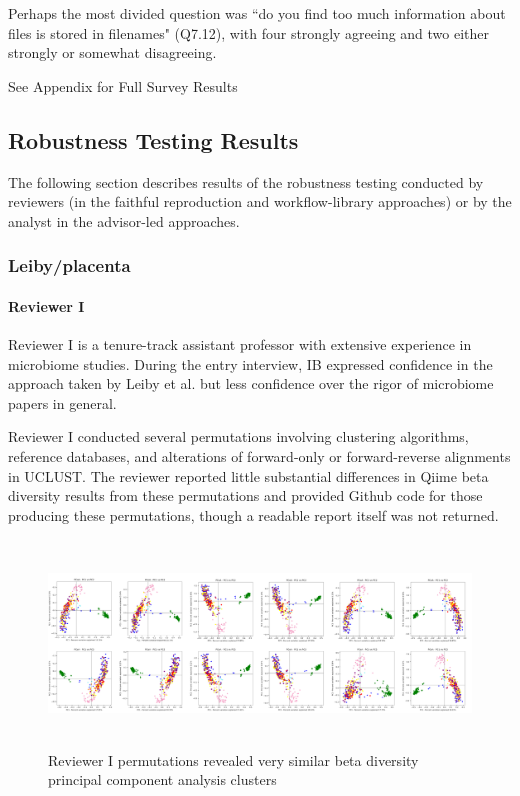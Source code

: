 \documentclass{drexelthesis}
\begin{document}
Perhaps the most divided question was ``do you find too much information about files is stored in filenames" (Q7.12), with four strongly agreeing and two either strongly or somewhat disagreeing.

See Appendix for Full Survey Results

\subsection{Robustness Testing Results}

The following section describes results of the robustness testing conducted by reviewers (in the faithful reproduction and workflow-library approaches) or by the analyst in the advisor-led approaches.

\subsubsection{Leiby/placenta}

\paragraph{Reviewer I}
Reviewer I is a tenure-track assistant professor with extensive experience in microbiome studies. During the entry interview, IB expressed confidence in the approach taken by Leiby et al. but less confidence over the rigor of microbiome papers in general.

Reviewer I conducted several permutations involving clustering algorithms, reference databases, and alterations of forward-only or forward-reverse alignments in UCLUST. The reviewer reported little substantial differences in Qiime beta diversity results from these permutations and provided Github code for those producing these permutations, though a readable report itself was not returned.


\begin{figure}[h!]
	\centering
	\includegraphics[width=\textwidth,height=5.47cm]{./images/betapermute.png}
	\caption{Reviewer I permutations revealed very similar beta diversity principal component analysis clusters}
	\label{betapermute}
\end{figure}
\end{document}
